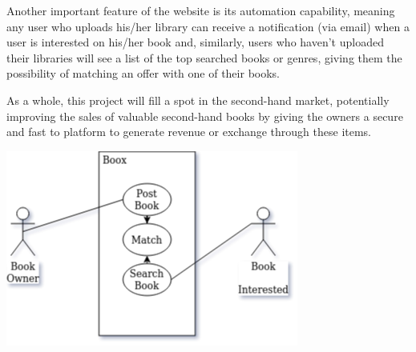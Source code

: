 \documentclass{article}
\begin{document}
Another important feature of the website is its automation capability, meaning any user who uploads his/her library can receive a notification (via email) when a user is interested on his/her book and, similarly, users who haven't uploaded their libraries will see a list of the top searched books or genres, giving them the possibility of matching an offer with one of their books.

As a whole, this project will fill a spot in the second-hand market, potentially improving the sales of valuable second-hand books by giving the owners a secure and fast to platform to generate revenue or exchange through these items.

\begin{center}
\includegraphics[scale=0.5]{img/diagram.png}    
\end{center}
\end{document}
